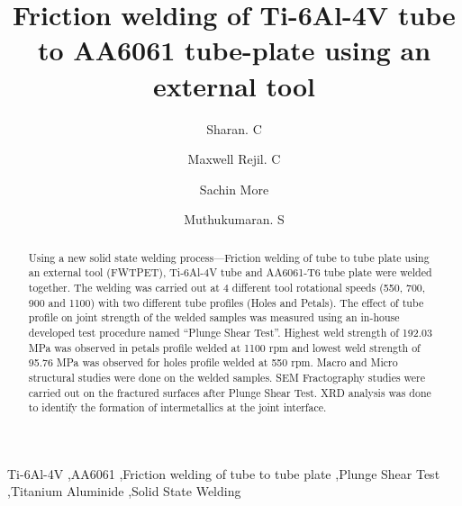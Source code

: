 \documentclass[3p]{elsarticle}
\begin{document}
\newcommand{\degree}{\ensuremath{^{\circ}}}  %

\begin{frontmatter}

\title{Friction welding of Ti-6Al-4V tube to AA6061 tube-plate using an external tool}

\author[META]{Sharan. C}
\author[META]{Maxwell Rejil. C}
\author[META]{Sachin More}
\author[META]{Muthukumaran. S}


\address[META]{Department of Metallurgical and Materials Engineering, National Institute of Technology, Tiruchirappalli-620015, India}
         
\begin{abstract}
Using a new solid state welding process---Friction welding of tube to tube plate using an external tool (FWTPET), Ti-6Al-4V tube and AA6061-T6 tube plate were welded together. The welding was carried out at 4 different tool rotational speeds (550, 700, 900 and 1100) with two different tube profiles (Holes and Petals). The effect of tube profile on joint strength of the welded samples was measured using an in-house developed test procedure named ``Plunge Shear Test''. Highest weld strength of 192.03 MPa was observed in petals profile welded at 1100 rpm and lowest weld strength of 95.76 MPa was observed for holes profile welded at 550 rpm. Macro and Micro structural studies were done on the welded samples. SEM Fractography studies were carried out on the fractured surfaces after Plunge Shear Test. XRD analysis was done to identify the formation of intermetallics at the joint interface.
\end{abstract}

\begin{keyword}
Ti-6Al-4V \sep AA6061 \sep Friction welding of tube to tube plate \sep Plunge Shear Test \sep Titanium Aluminide \sep  Solid State Welding
\end{keyword}

\end{frontmatter}
\end{document}
